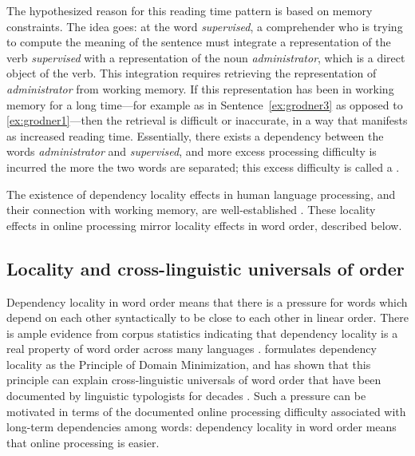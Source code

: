 The hypothesized reason for this reading time pattern is based on memory constraints. The idea goes: at the word \emph{supervised}, a comprehender who is trying to compute the meaning of the sentence must integrate a representation of the verb \emph{supervised} with a representation of the noun \emph{administrator}, which is a direct object of the verb. This integration requires retrieving the representation of \emph{administrator} from working memory. If this representation has been in working memory for a long time---for example as in Sentence~\ref{ex:grodner3} as opposed to \ref{ex:grodner1}---then the retrieval is difficult or inaccurate, in a way that manifests as increased reading time. Essentially, there exists a dependency between the words \emph{administrator} and \emph{supervised}, and more excess processing difficulty is incurred the more the two words are separated; this excess difficulty is called a .

The existence of dependency locality effects in human language processing, and their connection with working memory, are well-established \citep{fedorenko2013direct}. These locality effects in online processing mirror locality effects in word order, described below.



\subsection{Locality and cross-linguistic universals of order}

Dependency locality in word order means that there is a pressure for words which depend on each other syntactically to be close to each other in linear order.
There is ample evidence from corpus statistics indicating that dependency locality is a real property of word order across many languages \citep{ferrericancho2004euclidean,gildea-optimizing-2007,liu2008dependency,gildea-grammars-2010,futrell-large-scale-2015,liu-dependency-2017,temperley-minimizing-2018}. 
\citet{hawkins1994performance,hawkins-efficiency-2003} formulates dependency locality as the Principle of Domain Minimization, and has shown that this principle can explain cross-linguistic universals of word order that have been documented by linguistic typologists for decades \citep{greenberg-universals-1963}. 
Such a pressure can be motivated in terms of the documented online processing difficulty associated with long-term dependencies among words: dependency locality in word order means that online processing is easier.

